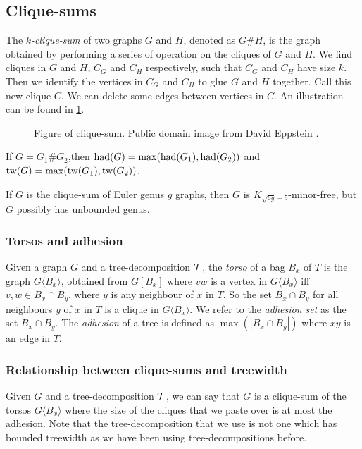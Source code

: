\subsection{Clique-sums}\label{sssec:Clique_Sums}
The \textit{$k$-clique-sum} of two graphs $G$ and $H$, denoted as $G \# H$, is the graph obtained by performing a series of operation on the cliques of $G$ and $H$. We find cliques in $G$ and $H$, $C_G$ and $C_H$ respectively, such that $C_G$ and $C_H$ have size $k$. Then we identify the vertices in $C_G$ and $C_H$ to glue $G$ and $H$ together. Call this new clique $C$. We can delete some edges between vertices in $C$. An illustration can be found in \cref{fig:clique-sum}. 

\begin{figure}[h]
	\centering
	
	\caption{Figure of clique-sum. Public domain image from David Eppstein \cite{eppsteinCliquesum2023}.}
	\label{fig:clique-sum}
\end{figure}


\begin{lemma}
	If $G = G_1 \# G_2$,then $\text{had}(G) = \max(\text{had}(G_1), \text{had}(G_2))$ and $\text{tw}(G) = \max(\text{tw}(G_1), \text{tw}(G_2))$.
\end{lemma}

\begin{example}\label{ex:clique_sum_genus}
	If $G$ is the clique-sum of Euler genus $g$ graphs, then $G$ is $K_{\sqrt{6g} + 5}$-minor-free, but $G$ possibly has unbounded genus.
\end{example}

\subsubsection{Torsos and adhesion}\label{sssec:Torsos and Adhesion}
Given a graph $G$ and a tree-decomposition $\mathcal{T}$, the \textit{torso} of a bag $B_x$ of $T$ is the graph $G\langle B_x \rangle$, obtained from $G[B_x]$ where $vw$ is a vertex in $G\langle B_x \rangle$ iff $v,w \in B_x \cap B_y$, where $y$ is any neighbour of $x$ in $T$. So the set $B_x \cap B_y$ for all neighbours $y$ of $x$ in $T$ is a clique in $G\langle B_x \rangle$.
We refer to the \textit{adhesion set} as the set $B_x \cap B_y$. 
The \textit{adhesion} of a tree is defined as $\max(|B_x \cap B_y|)$ where $xy$ is an edge in $T$.

\subsubsection{Relationship between clique-sums and treewidth}
Given $G$ and a tree-decomposition $\mathcal{T}$, we can say that $G$ is a clique-sum of the torsos $G\langle B_x \rangle$ where the size of the cliques that we paste over is at most the adhesion. Note that the tree-decomposition that we use is not one which has bounded treewidth as we have been using tree-decompositions before.

